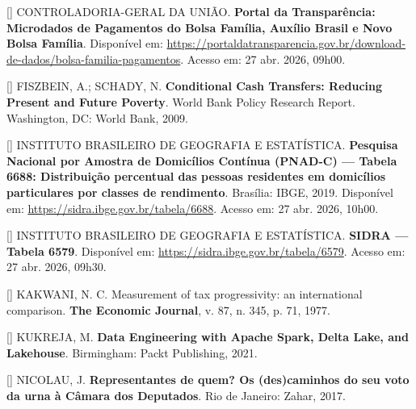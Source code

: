 \documentclass[12pt,a4paper,oneside]{article}
\begin{document}
\begin{singlespace}
\noindent\hangindent=1.25cm
[\theequation\label{ref:cgu}]
CONTROLADORIA-GERAL DA UNIÃO. \textbf{Portal da Transparência:
Microdados de Pagamentos do Bolsa Família, Auxílio Brasil e Novo
Bolsa Família}. Disponível em:
\url{https://portaldatransparencia.gov.br/download-de-dados/bolsa-familia-pagamentos}.
Acesso em: 27 abr. 2026, 09h00.\par\smallskip

\noindent\hangindent=1.25cm
[\theequation\label{ref:fiszbein}]
FISZBEIN, A.; SCHADY, N. \textbf{Conditional Cash Transfers:
Reducing Present and Future Poverty}. World Bank Policy Research
Report. Washington, DC: World Bank, 2009.\par\smallskip

\noindent\hangindent=1.25cm
[\theequation\label{ref:ibge-pnad}]
INSTITUTO BRASILEIRO DE GEOGRAFIA E ESTATÍSTICA. \textbf{Pesquisa
Nacional por Amostra de Domicílios Contínua (PNAD-C) — Tabela 6688:
Distribuição percentual das pessoas residentes em domicílios
particulares por classes de rendimento}. Brasília: IBGE, 2019.
Disponível em: \url{https://sidra.ibge.gov.br/tabela/6688}. Acesso
em: 27 abr. 2026, 10h00.\par\smallskip

\noindent\hangindent=1.25cm
[\theequation\label{ref:ibge-sidra}]
INSTITUTO BRASILEIRO DE GEOGRAFIA E ESTATÍSTICA. \textbf{SIDRA —
Tabela 6579}. Disponível em:
\url{https://sidra.ibge.gov.br/tabela/6579}. Acesso em: 27 abr.
2026, 09h30.\par\smallskip

\noindent\hangindent=1.25cm
[\theequation\label{ref:kakwani}]
KAKWANI, N. C. Measurement of tax progressivity: an international
comparison. \textbf{The Economic Journal}, v. 87, n. 345, p.
71, 1977.\par\smallskip

\noindent\hangindent=1.25cm
[\theequation\label{ref:kukreja}]
KUKREJA, M. \textbf{Data Engineering with Apache Spark, Delta Lake,
and Lakehouse}. Birmingham: Packt Publishing, 2021.\par\smallskip

\noindent\hangindent=1.25cm
[\theequation\label{ref:nicolau}]
NICOLAU, J. \textbf{Representantes de quem? Os (des)caminhos do seu
voto da urna à Câmara dos Deputados}. Rio de Janeiro: Zahar, 2017.
\par\smallskip


\end{singlespace}
\end{document}
